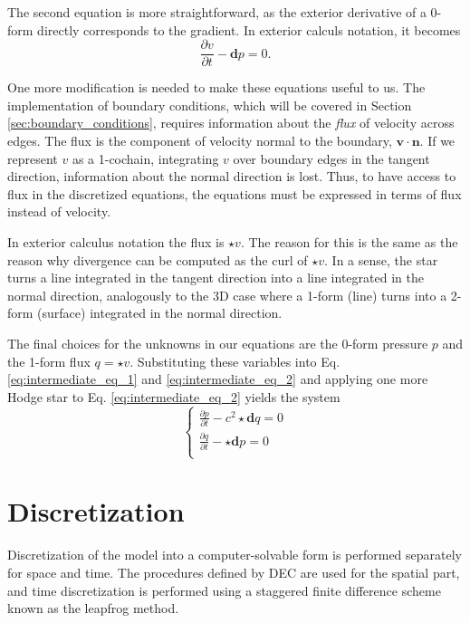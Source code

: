 \documentclass[utf8,english]{gradu3}
\begin{document}
The second equation is more straightforward,
as the exterior derivative of a 0-form directly corresponds to the gradient.
In exterior calculs notation, it becomes
\begin{equation}\label{eq:intermediate_eq_2}
  \frac{\partial v}{\partial t} - \mathbf{d} p = 0.
\end{equation}

One more modification is needed to make these equations useful to us.
The implementation of boundary conditions,
which will be covered in Section \ref{sec:boundary_conditions},
requires information about the \textit{flux} of velocity across edges.
The flux is the component of velocity normal to the boundary, $\mathbf{v} \cdot \mathbf{n}$.
If we represent $v$ as a 1-cochain, integrating $v$ over boundary edges
in the tangent direction, information about the normal direction is lost.
Thus, to have access to flux in the discretized equations,
the equations must be expressed in terms of flux instead of velocity.

In exterior calculus notation the flux is $\star v$.
The reason for this is the same as the reason
why divergence can be computed as the curl of $\star v$.
In a sense, the star turns a line integrated in the tangent direction
into a line integrated in the normal direction,
analogously to the 3D case where a 1-form (line)
turns into a 2-form (surface) integrated in the normal direction.

The final choices for the unknowns in our equations
are the 0-form pressure $p$
and the 1-form flux $q = \star v$.
Substituting these variables into Eq. \eqref{eq:intermediate_eq_1}
and \eqref{eq:intermediate_eq_2} and applying one more Hodge star 
to Eq. \eqref{eq:intermediate_eq_2} yields the system
\begin{equation}
  \begin{cases}
    \frac{\partial p}{\partial t} - c^2 \star \mathbf{d} q = 0 \\
    \frac{\partial q}{\partial t} - \star \mathbf{d} p = 0 \\
  \end{cases}
\end{equation}


\section{Discretization}

Discretization of the model into a computer-solvable form
is performed separately for space and time.
The procedures defined by DEC are used for the spatial part,
and time discretization is performed using a staggered
finite difference scheme known as the leapfrog method.
\end{document}
